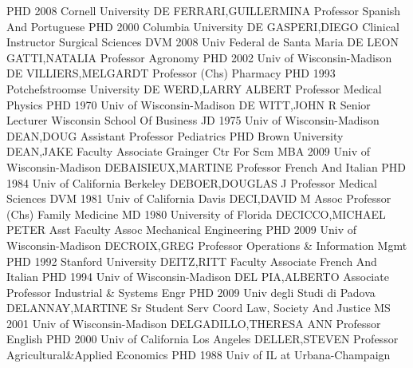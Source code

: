 \documentclass[
]{article}
\begin{document}
\textbar PHD 2008 Cornell University \textbar{}  \textbar DE
FERRARI,GUILLERMINA \textbar Professor \textbar Spanish And Portuguese
\textbar PHD 2000 Columbia University \textbar{}  \textbar DE
GASPERI,DIEGO \textbar Clinical Instructor \textbar Surgical Sciences
\textbar DVM 2008 Univ Federal de Santa Maria \textbar{} 
\textbar DE LEON GATTI,NATALIA \textbar Professor \textbar Agronomy
\textbar PHD 2002 Univ of Wisconsin-Madison \textbar{} 
\textbar DE VILLIERS,MELGARDT \textbar Professor (Chs) \textbar Pharmacy
\textbar PHD 1993 Potchefstroomse University \textbar{} 
\textbar DE WERD,LARRY ALBERT \textbar Professor \textbar Medical
Physics \textbar PHD 1970 Univ of Wisconsin-Madison \textbar{}
 \textbar DE WITT,JOHN R \textbar Senior Lecturer
\textbar Wisconsin School Of Business \textbar JD 1975 Univ of
Wisconsin-Madison \textbar{}  \textbar DEAN,DOUG
\textbar Assistant Professor \textbar Pediatrics \textbar PHD Brown
University \textbar{}  \textbar DEAN,JAKE \textbar Faculty
Associate \textbar Grainger Ctr For Scm \textbar MBA 2009 Univ of
Wisconsin-Madison \textbar{}  \textbar DEBAISIEUX,MARTINE
\textbar Professor \textbar French And Italian \textbar PHD 1984 Univ of
California Berkeley \textbar{}  \textbar DEBOER,DOUGLAS J
\textbar Professor \textbar Medical Sciences \textbar DVM 1981 Univ of
California Davis \textbar{}  \textbar DECI,DAVID M
\textbar Assoc Professor (Chs) \textbar Family Medicine \textbar MD 1980
University of Florida \textbar{}  \textbar DECICCO,MICHAEL
PETER \textbar Asst Faculty Assoc \textbar Mechanical Engineering
\textbar PHD 2009 Univ of Wisconsin-Madison \textbar{} 
\textbar DECROIX,GREG \textbar Professor \textbar Operations \&
Information Mgmt \textbar PHD 1992 Stanford University \textbar{}
 \textbar DEITZ,RITT \textbar Faculty Associate
\textbar French And Italian \textbar PHD 1994 Univ of Wisconsin-Madison
\textbar{}  \textbar DEL PIA,ALBERTO \textbar Associate
Professor \textbar Industrial \& Systems Engr \textbar PHD 2009 Univ
degli Studi di Padova \textbar{}  \textbar DELANNAY,MARTINE
\textbar Sr Student Serv Coord \textbar Law, Society And Justice
\textbar MS 2001 Univ of Wisconsin-Madison \textbar{} 
\textbar DELGADILLO,THERESA ANN \textbar Professor \textbar English
\textbar PHD 2000 Univ of California Los Angeles \textbar{} 
\textbar DELLER,STEVEN \textbar Professor \textbar Agricultural\&Applied
Economics \textbar PHD 1988 Univ of IL at Urbana-Champaign \textbar{}
\end{document}
